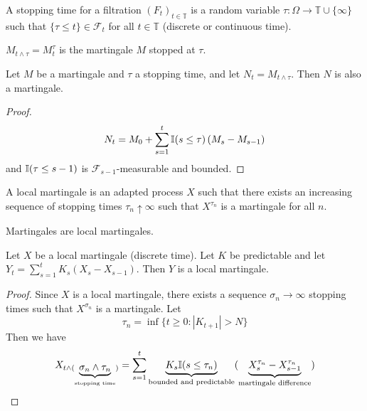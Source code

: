 \begin{defn}
  \label{defn:discrete_time_models:15}
  A stopping time for a filtration $(F_{t})_{t \in \mathbb{T}}$ is a
  random variable $\tau: \Omega \rightarrow \mathbb{T} \cup \{ \infty
  \}$ such that $\{ \tau \leq t \} \in \mathcal{F}_{t}$ for all $t \in
  \mathbb{T}$ (discrete or continuous time). 
\end{defn}

\begin{notation}
  $M_{t \wedge \tau} = M_{t}^{\tau}$ is the martingale $M$ stopped at $\tau$.
\end{notation}

\begin{proposition}
  Let $M$ be a martingale and $\tau$ a stopping time, and let $N_{t} =
  M_{t \wedge \tau}$.  Then $N$ is also a martingale.
\end{proposition}

\begin{proof}
  \begin{align}
    \label{eq:11}
    N_{t} = M_{0} + \sum_{s=1}^{t} \I{s \leq \tau} (M_{s} - M_{s-1})
  \end{align} and $\I{\tau \leq s-1}$ is
  $\mathcal{F}_{s-1}$-measurable and bounded.
\end{proof}

\begin{defn}
  \label{defn:discrete_time_models:16}
  A local martingale is an adapted process $X$ such that there exists
  an increasing sequence of stopping times $\tau_{n} \uparrow \infty$
  such that $X^{\tau_{n}}$ is a martingale for all $n$.
\end{defn}

\begin{remark}
  Martingales are local martingales.
\end{remark}

\begin{proposition}
  Let $X$ be a local martingale (discrete time). Let $K$ be
  predictable and let $Y_{t} = \sum_{s=1}^{t} K_{s}(X_{s} - X_{s-1})$.
  Then $Y$ is a local martingale.
\end{proposition}

\begin{proof}
  Since $X$ is a local martingale, there exists a sequence $\sigma_{n}
  \rightarrow \infty$ stopping times such that $X^{\sigma_{n}}$ is a
  martingale. Let
  \begin{equation}
    \label{eq:13}
    \tau_{n} = \inf \{ t \geq 0 : |K_{t+1}| > N \}
  \end{equation} Then we have
  \begin{align}
    \label{eq:14}
    X_{t \wedge (\underbrace{\sigma_{n} \wedge \tau_{n}}_{\text{stopping time}})} = \sum_{s = 1}^{t} \underbrace{K_{s} \I{s
      \leq \tau_{n}}}_{\text{bounded and predictable}} (\underbrace{X_{s}^{\tau_{n}} -
      X_{s-1}^{\tau_{n}}}_{\text{martingale difference}})
  \end{align}
\end{proof}

